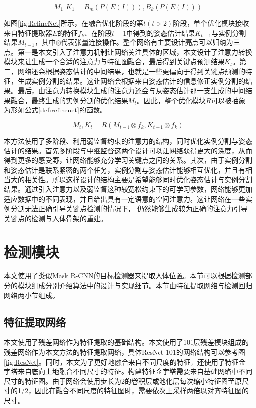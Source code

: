 \begin{equation}
\label{def:detectnet}
M_1, K_1 = B_m(P(E(I))), B_k(P(E(I)))
\end{equation}

如图\ref{fig:RefineNet}所示，在融合优化阶段的第$t(t>2)$阶段，单个优化模块接收来自特征提取器$E$的特征$f_k$、在阶段$t-1$中得到的姿态估计结果$K_{t-1}$与实例分割结果$M_{t-1}$，其中$\otimes$代表张量连接操作。整个网络有主要设计亮点可以归纳为三点。第一是本文引入了注意力机制让网络关注具体的区域，本文设计了注意力转换模块来让生成一个合适的注意力与特征图融合，最后得到关键点预测结果$K_t$。第二，网络还会根据姿态估计的中间结果，也就是一些更偏向于得到关键点预测的特征，生成实例分割的结果。这让网络会根据来自姿态估计的信息修正实例分割的结果。最后，由注意力转换模块生成的注意力还会与从姿态估计那一支生成的中间结果融合，最终生成的实例分割的优化结果$M_t$。因此，整个优化模块$R$可以被抽象为形如公式\eqref{def:refinenet}的函数。


\begin{equation}
\label{def:refinenet}
M_t, K_t = R(M_{t-1}\otimes f_k, K_{t-1}\otimes f_k)
\end{equation}

本方法使用了多阶段、利用弱监督约束的注意力的结构，同时优化实例分割与姿态估计的结果。首先多阶段与中继监督这两个设计可以让网络获得更大的深度，从而得到更多的感受野，让网络能够充分学习关键点之间的关系\cite{wei2016convolutional}。其次，由于实例分割和姿态估计是联系紧密的两个任务，实例分割与姿态估计能够相互优化，并且有相当大的相关性。所以这样设计的结构主要是希望能够同时优化姿态估计与实例分割结果。通过引入注意力以及弱监督这种较宽松约束下的可学习参数，网络能够更加适应数据中的不同表现，并且给出具有一定语意的空间注意力\cite{wang2017residual}。这让网络在一些实例分割无法正确引导关键点检测的情况下， 仍然能够生成较为正确的注意力引导关键点的检测与人体骨架的重建。

\section{检测模块}
\label{sec:detectionstage}
本文使用了类似Mask R-CNN\cite{He2017Mask}的目标检测器来提取人体位置。本节可以根据检测部分的模块组成分别介绍算法中的设计与实现细节。本节由特征提取网络与检测回归网络两小节组成。

\subsection{特征提取网络}
\label{subsec:featextract}
本文使用了残差网络作为特征提取的基础结构。本文使用了101层残差模块组成的残差网络作为本文方法的特征提取网络，具体ResNet-101的网络结构可以参考图\ref{fig:ResNet}。同时，本文为了更好地融合来自不同尺度的特征，还使用了特征金字塔\cite{Lin2016Feature}来自底向上地融合不同尺寸的特征。构建特征金字塔需要来自基础网络中不同尺寸的特征图。由于网络会使用步长为2的卷积层或池化层每次缩小特征图至原尺寸的1/2，因此在融合不同尺度的特征图时，需要依次上采样两倍以对齐特征图的尺寸。

